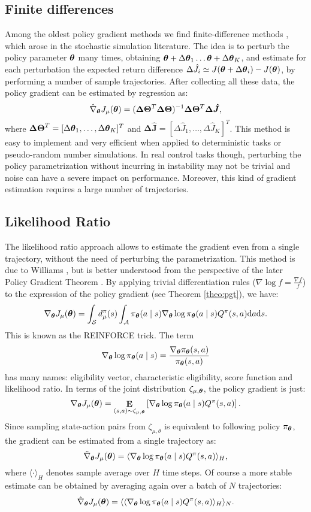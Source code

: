 \subsection{Finite differences}
Among the oldest policy gradient methods we find finite-difference methods \cite{Glynn:1990:LRG:84537.84552}, which arose in the stochastic simulation literature. The idea is to perturb the policy parameter $\boldsymbol{\theta}$ many times, obtaining $\boldsymbol{\theta}+\Delta\boldsymbol{\theta}_1 \dots \boldsymbol{\theta}+\Delta\boldsymbol{\theta}_K$, and estimate for each perturbation the expected return difference $\Delta\hat{J}_i \simeq J(\boldsymbol{\theta}+\Delta\boldsymbol{\theta}_i) - J(\boldsymbol{\theta})$, by performing a number of sample trajectories. After collecting all these data, the policy gradient can be estimated by regression as:
\[
	\hat{\nabla}_{\boldsymbol{\theta}}J_{\mu}(\boldsymbol{\theta}) = (\boldsymbol{\Delta\Theta}^T\boldsymbol{\Delta\Theta})^{-1}\boldsymbol{\Delta\Theta}^T\boldsymbol{\Delta\hat{J}},
\]
where $\boldsymbol{\Delta\Theta}^T = [\Delta\boldsymbol{\theta}_1,\dots,\Delta\boldsymbol{\theta}_K]^T$ and $\boldsymbol{\Delta\hat{J}} = [\Delta\hat{J}_1,\dots,\Delta\hat{J}_K]^T$. This method is easy to implement and very efficient when applied to deterministic tasks or pseudo-random number simulations. In real control tasks though, perturbing the policy parametrization without incurring in instability may not be trivial and noise can have a severe impact on performance. Moreover, this kind of gradient estimation requires a large number of trajectories.

\subsection{Likelihood Ratio}\label{sec:likelihood_ratio}
The likelihood ratio approach allows to estimate the gradient even from a single trajectory, without the need of perturbing the parametrization. This method is due to Williams \cite{Williams1992}, but is better understood from the perspective of the later Policy Gradient Theorem \cite{Sutton1999a}.
By applying trivial differentiation rules ($\nabla\log f = \frac{\nabla f}{f}$) to the expression of the policy gradient (see Theorem \ref{theo:pgt}), we have:
\[
	\nabla_{\boldsymbol{\theta}}J_\mu(\boldsymbol{\theta}) = \int_{\mathcal{S}}d_{\mu}^{\pi}(s)
		\int_{\mathcal{A}}\pi_{\boldsymbol{\theta}}(a \mid s)\nabla_{\boldsymbol{\theta}}\log\pi_{\boldsymbol{\theta}}(a \mid s)
		Q^{\pi}(s,a)\mathrm{d}a\mathrm{d}s.
\]
This is known as the REINFORCE \cite{Williams1992} trick. The term
\[
	\nabla_{\boldsymbol{\theta}}\log\pi_{\boldsymbol{\theta}}(a \mid s) = \frac{\nabla_{\boldsymbol{\theta}}\pi_{\boldsymbol{\theta}}(s,a)}{\pi_{\boldsymbol{\theta}}(s,a)}
\]
has many names: eligibility vector, characteristic eligibility, score function and likelihood ratio.
In terms of the joint distribution $\zeta_{\mu,\boldsymbol{\theta}}$, the policy gradient is just:
\[
	\nabla_{\boldsymbol{\theta}}J_\mu(\boldsymbol{\theta}) = \mathop{\mathbf{E}}_{(s,a)\sim\zeta_{\mu,\boldsymbol{\theta}}}\left[\nabla_{\boldsymbol{\theta}}\log\pi_{\boldsymbol{\theta}}(a \mid s) Q^{\pi}(s,a)\right].
\]
Since sampling state-action pairs from $\zeta_{\mu,\theta}$ is equivalent to following policy $\pi_{\boldsymbol{\theta}}$, the gradient can be estimated from a single trajectory as:
\[
	\tilde{\nabla}_{\boldsymbol{\theta}}J_{\mu}(\boldsymbol{\theta}) = \langle\nabla_{\boldsymbol{\theta}}\log\pi_{\boldsymbol{\theta}}(a \mid s) Q^{\pi}(s,a)\rangle_H,
\]
where $\langle\cdot\rangle_H$ denotes sample average over $H$ time steps. Of course a more stable estimate can be obtained by averaging again over a batch of $N$ trajectories:
\[
	\hat{\nabla}_{\boldsymbol{\theta}}J_{\mu}(\boldsymbol{\theta}) = \langle\langle\nabla_{\boldsymbol{\theta}}\log\pi_{\boldsymbol{\theta}}(a \mid s) Q^{\pi}(s,a)\rangle_H\rangle_N.
\]

